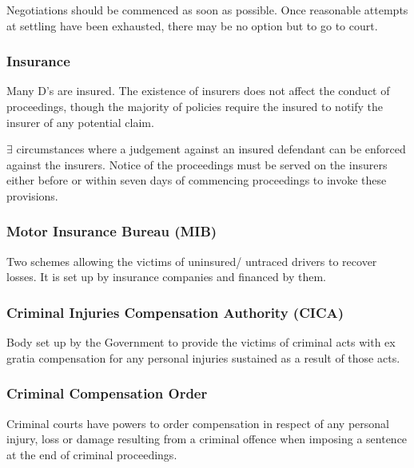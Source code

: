 \documentclass[
]{article}
\begin{document}
Negotiations should be commenced as soon as possible. Once reasonable
attempts at settling have been exhausted, there may be no option but to
go to court.

\hypertarget{insurance-1}{%
\subsubsection{Insurance}\label{insurance-1}}

Many D's are insured. The existence of insurers does not affect the
conduct of proceedings, though the majority of policies require the
insured to notify the insurer of any potential claim.

\(\exists\) circumstances where a judgement against an insured defendant
can be enforced against the insurers. Notice of the proceedings must be
served on the insurers either before or within seven days of commencing
proceedings to invoke these provisions.

\hypertarget{motor-insurance-bureau-mib}{%
\subsubsection{Motor Insurance Bureau
(MIB)}\label{motor-insurance-bureau-mib}}

Two schemes allowing the victims of uninsured/ untraced drivers to
recover losses. It is set up by insurance companies and financed by
them.

\hypertarget{criminal-injuries-compensation-authority-cica}{%
\subsubsection{Criminal Injuries Compensation Authority
(CICA)}\label{criminal-injuries-compensation-authority-cica}}

Body set up by the Government to provide the victims of criminal acts
with ex gratia compensation for any personal injuries sustained as a
result of those acts.

\hypertarget{criminal-compensation-order}{%
\subsubsection{Criminal Compensation
Order}\label{criminal-compensation-order}}

Criminal courts have powers to order compensation in respect of any
personal injury, loss or damage resulting from a criminal offence when
imposing a sentence at the end of criminal proceedings.
\end{document}
